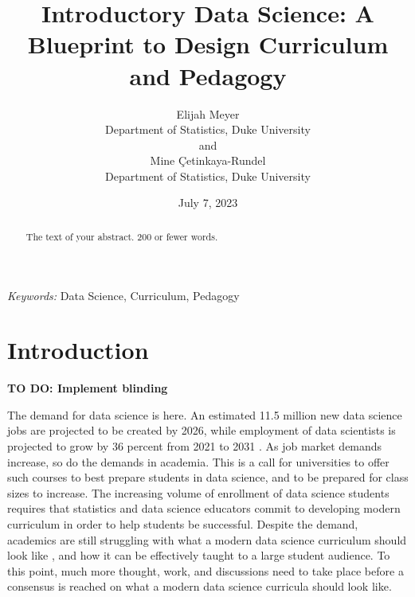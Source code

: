\documentclass[
  12pt]{article}
\begin{document}
\def\spacingset#1{\renewcommand{\baselinestretch}%
{#1}\small\normalsize} \spacingset{1}



\date{July 7, 2023}
\title{\bf Introductory Data Science: A Blueprint to Design Curriculum
and Pedagogy}
\author{
Elijah Meyer\\
Department of Statistics, Duke University\\
and\\Mine Çetinkaya-Rundel\\
Department of Statistics, Duke University\\
}
\maketitle

\bigskip
\bigskip
\begin{abstract}
The text of your abstract. 200 or fewer words.
\end{abstract}

\noindent%
{\it Keywords:} Data Science, Curriculum, Pedagogy
\vfill

\newpage
\spacingset{1.9} %
\ifdefined\Shaded\renewenvironment{Shaded}{\begin{tcolorbox}[borderline west={3pt}{0pt}{shadecolor}, enhanced, boxrule=0pt, breakable, frame hidden, sharp corners, interior hidden]}{\end{tcolorbox}}\fi

\hypertarget{introduction}{%
\section{Introduction}\label{introduction}}

\textbf{TO DO: Implement blinding}

The demand for data science is here. An estimated 11.5 million new data
science jobs are projected to be created by 2026, while employment of
data scientists is projected to grow by 36 percent from 2021 to 2031
\citep{labor_2022}. As job market demands increase, so do the demands in
academia. This is a call for universities to offer such courses to best
prepare students in data science, and to be prepared for class sizes to
increase. The increasing volume of enrollment of data science students
\citep{Redmond2022} requires that statistics and data science educators
commit to developing modern curriculum in order to help students be
successful. Despite the demand, academics are still struggling with what
a modern data science curriculum should look like \citep{Schwab2020},
and how it can be effectively taught to a large student audience. To
this point, much more thought, work, and discussions need to take place
before a consensus is reached on what a modern data science curricula
should look like.
\end{document}
